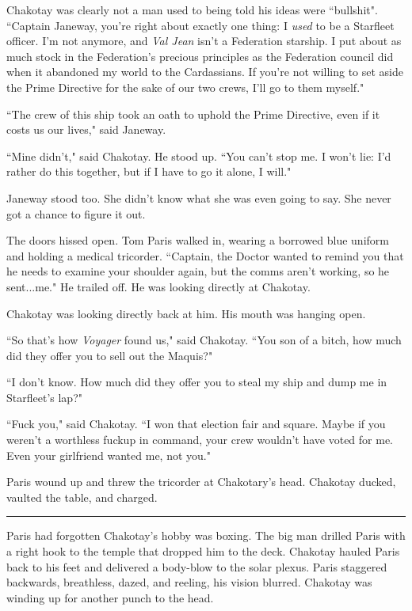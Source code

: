 \documentclass[twoside,letterpaper,12pt]{memoir}
\begin{document}
Chakotay was clearly not a man used to being told his ideas were ``bullshit". ``Captain Janeway, you're right about exactly one thing: I \textit{used} to be a Starfleet officer. I'm not anymore, and \textit{Val Jean} isn't a Federation starship. I put about as much stock in the Federation's precious principles as the Federation council did when it abandoned my world to the Cardassians. If you're not willing to set aside the Prime Directive for the sake of our two crews, I'll go to them myself."

``The crew of this ship took an oath to uphold the Prime Directive, even if it costs us our lives," said Janeway.

``Mine didn't," said Chakotay. He stood up. ``You can't stop me. I won't lie: I'd rather do this together, but if I have to go it alone, I will."

Janeway stood too. She didn't know what she was even going to say. She never got a chance to figure it out.

The doors hissed open. Tom Paris walked in, wearing a borrowed blue uniform and holding a medical tricorder. ``Captain, the Doctor wanted to remind you that he needs to examine your shoulder again, but the comms aren't working, so he sent...me." He trailed off. He was looking directly at Chakotay.

Chakotay was looking directly back at him. His mouth was hanging open.

``So that's how \textit{Voyager} found us," said Chakotay. ``You son of a bitch, how much did they offer you to sell out the Maquis?"

``I don't know. How much did they offer you to steal my ship and dump me in Starfleet's lap?"

``Fuck you," said Chakotay. ``I won that election fair and square. Maybe if you weren't a worthless fuckup in command, your crew wouldn't have voted for me. Even your girlfriend wanted me, not you."

Paris wound up and threw the tricorder at Chakotary's head. Chakotay ducked, vaulted the table, and charged.

\begin{center}\rule{3cm}{0.4 pt}\end{center}

Paris had forgotten Chakotay's hobby was boxing. The big man drilled Paris with a right hook to the temple that dropped him to the deck. Chakotay hauled Paris back to his feet and delivered a body-blow to the solar plexus. Paris staggered backwards, breathless, dazed, and reeling, his vision blurred. Chakotay was winding up for another punch to the head.
\end{document}

